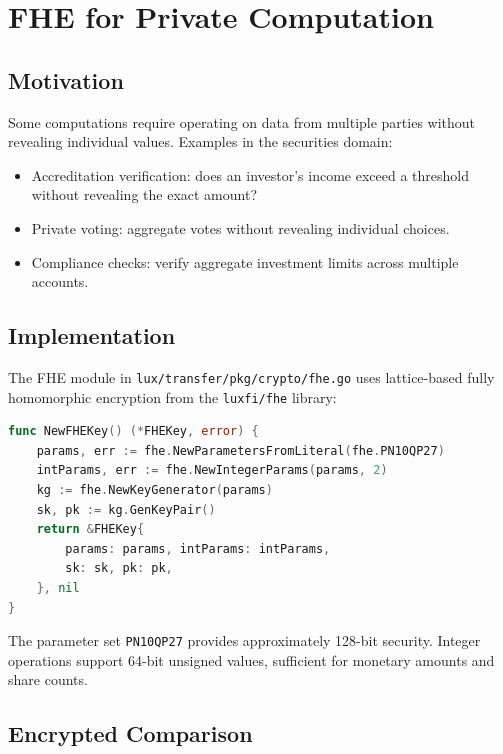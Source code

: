 \section{FHE for Private Computation}

\label{sec:fhe}

\subsection{Motivation}

Some computations require operating on data from multiple parties without
revealing individual values.  Examples in the securities domain:
\begin{itemize}[nosep]
  \item Accreditation verification: does an investor's income exceed
        a threshold without revealing the exact amount?
  \item Private voting: aggregate votes without revealing individual choices.
  \item Compliance checks: verify aggregate investment limits across
        multiple accounts.
\end{itemize}

\subsection{Implementation}

The FHE module in \texttt{lux/transfer/pkg/crypto/fhe.go} uses lattice-based
fully homomorphic encryption from the \texttt{luxfi/fhe} library:

\begin{lstlisting}[language=Go,caption={fhe.go: parameter initialization}]
func NewFHEKey() (*FHEKey, error) {
    params, err := fhe.NewParametersFromLiteral(fhe.PN10QP27)
    intParams, err := fhe.NewIntegerParams(params, 2)
    kg := fhe.NewKeyGenerator(params)
    sk, pk := kg.GenKeyPair()
    return &FHEKey{
        params: params, intParams: intParams,
        sk: sk, pk: pk,
    }, nil
}
\end{lstlisting}

The parameter set \texttt{PN10QP27} provides approximately 128-bit security.
Integer operations support 64-bit unsigned values, sufficient for monetary
amounts and share counts.

\subsection{Encrypted Comparison}

